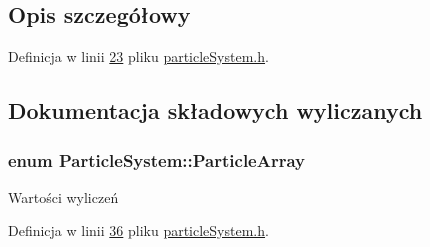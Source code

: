 \subsection{Opis szczegółowy}


Definicja w linii \hyperlink{particle_system_8h_source_l00023}{23} pliku \hyperlink{particle_system_8h_source}{particle\-System.\-h}.



\subsection{Dokumentacja składowych wyliczanych}
\hypertarget{class_particle_system_a332fbe57a36aaea5c18b4ea4fba6bbb3}{
\subsubsection[{Particle\-Array}]{\setlength{\rightskip}{0pt plus 5cm}enum {\bf Particle\-System\-::\-Particle\-Array}}}\label{class_particle_system_a332fbe57a36aaea5c18b4ea4fba6bbb3}
\begin{Desc}
\item[Wartości wyliczeń]\par
\begin{description}
\item[{\em 
\hypertarget{class_particle_system_a332fbe57a36aaea5c18b4ea4fba6bbb3a9e9a2992d230a2674debf26e0e8e0299}{P\-O\-S\-I\-T\-I\-O\-N}\label{class_particle_system_a332fbe57a36aaea5c18b4ea4fba6bbb3a9e9a2992d230a2674debf26e0e8e0299}
}]\item[{\em 
\hypertarget{class_particle_system_a332fbe57a36aaea5c18b4ea4fba6bbb3a3702de73065f01b4f6ffa604b799e53d}{V\-E\-L\-O\-C\-I\-T\-Y}\label{class_particle_system_a332fbe57a36aaea5c18b4ea4fba6bbb3a3702de73065f01b4f6ffa604b799e53d}
}]\end{description}
\end{Desc}


Definicja w linii \hyperlink{particle_system_8h_source_l00036}{36} pliku \hyperlink{particle_system_8h_source}{particle\-System.\-h}.


